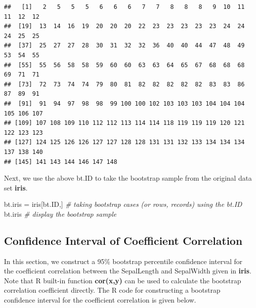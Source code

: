 \documentclass[
]{book}
\newenvironment{Shaded}{\begin{snugshade}}{\end{snugshade}}
\newcommand{\CommentTok}[1]{\textcolor[rgb]{0.56,0.35,0.01}{\textit{#1}}}
\newcommand{\NormalTok}[1]{#1}
\newcommand{\OtherTok}[1]{\textcolor[rgb]{0.56,0.35,0.01}{#1}}
\begin{document}
\begin{verbatim}
##   [1]   2   5   5   5   6   6   6   7   7   8   8   8   9  10  11  11  12  12
##  [19]  13  14  16  19  20  20  20  22  23  23  23  23  23  24  24  24  25  25
##  [37]  25  27  27  28  30  31  32  32  36  40  40  44  47  48  49  53  54  55
##  [55]  55  56  58  58  59  60  60  63  63  64  65  67  68  68  68  69  71  71
##  [73]  72  73  74  74  79  80  81  82  82  82  82  82  83  83  86  87  89  91
##  [91]  91  94  97  98  98  99 100 100 102 103 103 103 104 104 104 105 106 107
## [109] 107 108 109 110 112 112 113 114 114 118 119 119 119 120 121 122 123 123
## [127] 124 125 126 126 127 127 128 128 131 131 132 133 134 134 134 137 138 140
## [145] 141 143 144 146 147 148
\end{verbatim}

Next, we use the above bt.ID to take the bootstrap sample from the original data set \textbf{iris}.

\begin{Shaded}
\begin{Highlighting}[]
\NormalTok{bt.iris }\OtherTok{=}\NormalTok{ iris[bt.ID,]   }\CommentTok{\# taking bootstrap cases (or rows, records) using the bt.ID}
\NormalTok{bt.iris                  }\CommentTok{\# display the bootstrap sample}
\end{Highlighting}
\end{Shaded}

\hypertarget{confidence-interval-of-coefficient-correlation}{%
\subsection{Confidence Interval of Coefficient Correlation}\label{confidence-interval-of-coefficient-correlation}}

In this section, we construct a 95\% bootstrap percentile confidence interval for the coefficient correlation between the SepalLength and SepalWidth given in \textbf{iris}. Note that R built-in function \textbf{cor(x,y)} can be used to calculate the bootstrap correlation coefficient directly. The R code for constructing a bootstrap confidence interval for the coefficient correlation is given below.
\end{document}

